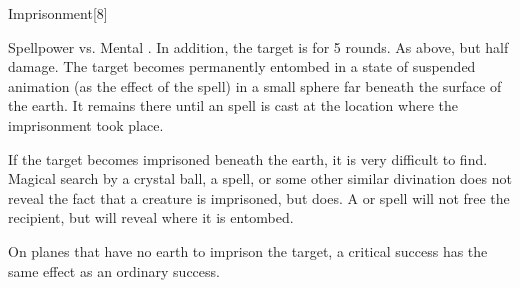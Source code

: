 \begin{spellsection}{Imprisonment}[8]
    \begin{spellheader}
    \end{spellheader}
    \begin{spellcontent}
        \begin{spelltargetinginfo}
        \end{spelltargetinginfo}
        \begin{spelleffects}
            \begin{spellattack}{Spellpower vs. Mental}
                \spellsuccess {}. In addition, the target is \slowed for 5 rounds.
                \spellfailure As above, but half damage.
                \spellcritical The target becomes permanently entombed in a state of suspended animation (as the effect of the  spell) in a small sphere far beneath the surface of the earth. It remains there until an  spell is cast at the location where the imprisonment took place.
            \end{spellattack}
        \end{spelleffects}
    \end{spellcontent}
    \begin{spellfooter}
        \spellnotes If the target becomes imprisoned beneath the earth, it is very difficult to find. Magical search by a crystal ball, a  spell, or some other similar divination does not reveal the fact that a creature is imprisoned, but  does. A  or  spell will not free the recipient, but will reveal where it is entombed.

        On planes that have no earth to imprison the target, a critical success has the same effect as an ordinary success.
        \miscastrandom
    \end{spellfooter}
\end{spellsection}

